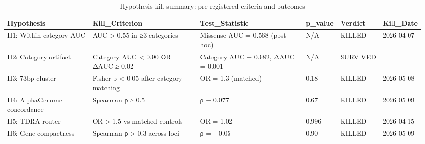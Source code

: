 \begin{table}
\caption{Hypothesis kill summary: pre-registered criteria and outcomes}
\label{tab:hypothesis_kills}
\begin{tabular}{llllll}
\toprule
Hypothesis & Kill_Criterion & Test_Statistic & p_value & Verdict & Kill_Date \\
\midrule
H1: Within-category AUC & AUC > 0.55 in ≥3 categories & Missense AUC = 0.568 (post-hoc) & N/A & KILLED & 2026-04-07 \\
H2: Category artifact & Category AUC < 0.90 OR ΔAUC ≥ 0.02 & Category AUC = 0.982, ΔAUC = 0.001 & N/A & SURVIVED & — \\
H3: 73bp cluster & Fisher p < 0.05 after category matching & OR = 1.3 (matched) & 0.18 & KILLED & 2026-05-08 \\
H4: AlphaGenome concordance & Spearman ρ ≥ 0.5 & ρ = 0.077 & 0.67 & KILLED & 2026-05-09 \\
H5: TDRA router & OR > 1.5 vs matched controls & OR = 1.02 & 0.996 & KILLED & 2026-04-15 \\
H6: Gene compactness & Spearman ρ > 0.3 across loci & ρ = −0.05 & 0.90 & KILLED & 2026-05-09 \\
\bottomrule
\end{tabular}
\end{table}
